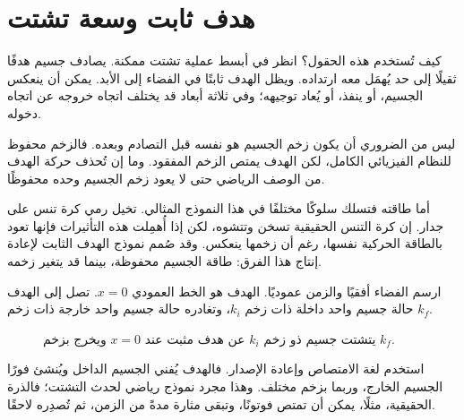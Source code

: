 
\section{هدف ثابت وسعة تشتت}

كيف تُستخدم هذه الحقول؟ انظر في أبسط عملية تشتت ممكنة. يصادف جسيم هدفًا ثقيلًا إلى حد يُهمَل معه ارتداده. ويظل الهدف ثابتًا في الفضاء إلى الأبد. يمكن أن ينعكس الجسيم، أو ينفذ، أو يُعاد توجيهه؛ وفي ثلاثة أبعاد قد يختلف اتجاه خروجه عن اتجاه دخوله.

ليس من الضروري أن يكون زخم الجسيم هو نفسه قبل التصادم وبعده. فالزخم محفوظ للنظام الفيزيائي الكامل، لكن الهدف يمتص الزخم المفقود. وما إن تُحذف حركة الهدف من الوصف الرياضي حتى لا يعود زخم الجسيم وحده محفوظًا.

أما طاقته فتسلك سلوكًا مختلفًا في هذا النموذج المثالي. تخيل رمي كرة تنس على جدار. إن كرة التنس الحقيقية تسخن وتتشوه، لكن إذا أُهمِلت هذه التأثيرات فإنها تعود بالطاقة الحركية نفسها، رغم أن زخمها ينعكس. وقد صُمم نموذج الهدف الثابت لإعادة إنتاج هذا الفرق: طاقة الجسيم محفوظة، بينما قد يتغير زخمه.

ارسم الفضاء أفقيًا والزمن عموديًا. الهدف هو الخط العمودي \(x=0\). تصل إلى الهدف حالة جسيم واحد داخلة ذات زخم \(k_i\)، وتغادره حالة جسيم واحد خارجة ذات زخم \(k_f\).

\begin{figure}[h]
\centering
{}
\caption{يتشتت جسيم ذو زخم \(k_i\) عن هدف مثبت عند \(x=0\) ويخرج بزخم \(k_f\).}
\end{figure}

استخدم لغة الامتصاص وإعادة الإصدار. فالهدف يُفني الجسيم الداخل ويُنشئ فورًا الجسيم الخارج، وربما بزخم مختلف. وهذا مجرد نموذج رياضي لحدث التشتت؛ فالذرة الحقيقية، مثلًا، يمكن أن تمتص فوتونًا، وتبقى مثارة مدةً من الزمن، ثم تُصدِره لاحقًا.

\begin{classroomqa}
\end{classroomqa}

